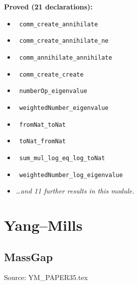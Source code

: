 \documentclass{report}
\theoremstyle{definition}
\begin{document}
\begin{itemize}
\begin{itemize}
\noindent\textbf{Proved (21 declarations):}
\begin{itemize}
  \item {}\leanok\ \texttt{comm\_create\_annihilate}
  \item {}\leanok\ \texttt{comm\_create\_annihilate\_ne}
  \item {}\leanok\ \texttt{comm\_annihilate\_annihilate}
  \item {}\leanok\ \texttt{comm\_create\_create}
  \item {}\leanok\ \texttt{numberOp\_eigenvalue}
  \item {}\leanok\ \texttt{weightedNumber\_eigenvalue}
  \item {}\leanok\ \texttt{fromNat\_toNat}
  \item {}\leanok\ \texttt{toNat\_fromNat}
  \item {}\leanok\ \texttt{sum\_mul\_log\_eq\_log\_toNat}
  \item {}\leanok\ \texttt{weightedNumber\_log\_eigenvalue}
  \item \emph{\ldots and 11 further results in this module.}
\end{itemize}

\section{Yang--Mills}

\subsection{MassGap}
Source: YM\_PAPER35.tex


\end{itemize}
\end{itemize}
\end{document}
